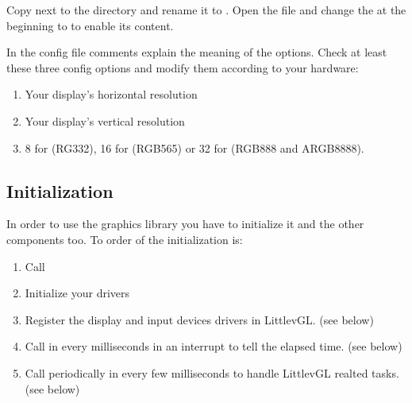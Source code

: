 \documentclass[letterpaper,10pt,english]{sphinxmanual}
\begin{document}
Copy  next to the  directory and rename it to . Open the file and change the  at the beginning to  to enable its content.

In the config file comments explain the meaning of the options. Check at least these three config options and modify them according to your hardware:
\begin{enumerate}
\item {} 
 Your display’s horizontal resolution

\item {} 
 Your display’s vertical resolution

\item {} 
 8 for (RG332), 16 for (RGB565) or 32 for (RGB888 and ARGB8888).

\end{enumerate}


\subsection{Initialization}
\label{\detokenize{porting/project:initialization}}
In order to use the graphics library you have to initialize it and the other components too. To order of the initialization is:
\begin{enumerate}
\item {} 
Call 

\item {} 
Initialize your drivers

\item {} 
Register the display and input devices drivers in LittlevGL. (see below)

\item {} 
Call  in every  milliseconds in an interrupt to tell the elapsed time. (see below)

\item {} 
Call  periodically in every few milliseconds to handle LittlevGL realted tasks. (see below)

\end{enumerate}
\end{document}
